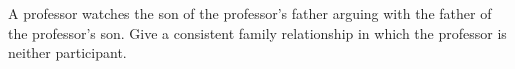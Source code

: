 A professor watches the son of the professor's father arguing with the father of the professor's son. Give a consistent family relationship in which the professor is neither participant.
